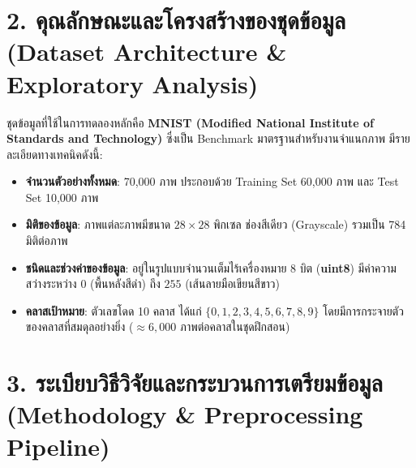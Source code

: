 \documentclass[12pt,a4paper]{article}
\newcommand{\codevar}[1]{\textcolor{codeaccent}{\textbf{#1}}}
\begin{document}
\section*{2. คุณลักษณะและโครงสร้างของชุดข้อมูล\\ \large(Dataset Architecture \& Exploratory Analysis)}

ชุดข้อมูลที่ใช้ในการทดลองหลักคือ \textbf{MNIST (Modified National Institute of Standards and Technology)} ซึ่งเป็น Benchmark มาตรฐานสำหรับงานจำแนกภาพ มีรายละเอียดทางเทคนิคดังนี้:
\begin{itemize}[leftmargin=18pt, itemsep=2pt]
    \item \textbf{จำนวนตัวอย่างทั้งหมด}: 70,000 ภาพ ประกอบด้วย Training Set 60,000 ภาพ และ Test Set 10,000 ภาพ
    \item \textbf{มิติของข้อมูล}: ภาพแต่ละภาพมีขนาด $28 \times 28$ พิกเซล ช่องสีเดียว (Grayscale) รวมเป็น 784 มิติต่อภาพ
    \item \textbf{ชนิดและช่วงค่าของข้อมูล}: อยู่ในรูปแบบจำนวนเต็มไร้เครื่องหมาย 8 บิต (\codevar{uint8}) มีค่าความสว่างระหว่าง $0$ (พื้นหลังสีดำ) ถึง $255$ (เส้นลายมือเขียนสีขาว)
    \item \textbf{คลาสเป้าหมาย}: ตัวเลขโดด 10 คลาส ได้แก่ $\{0, 1, 2, 3, 4, 5, 6, 7, 8, 9\}$ โดยมีการกระจายตัวของคลาสที่สมดุลอย่างยิ่ง ($\approx 6,000$ ภาพต่อคลาสในชุดฝึกสอน)
\end{itemize}

\section*{3. ระเบียบวิธีวิจัยและกระบวนการเตรียมข้อมูล\\ \large(Methodology \& Preprocessing Pipeline)}
\end{document}
